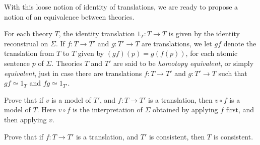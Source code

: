 With this loose notion of identity of translations, we are ready to
propose a notion of an equivalence between theories.

\begin{defn} For each theory $T$, the identity translation
  $1_T:T\to T$ is given by the identity reconstrual on $\Sigma$.  If
  $f:T\to T'$ and $g:T'\to T$ are translations, we let $gf$ denote the
  translation from $T$ to $T$ given by $(gf)(p)=g(f(p))$, for each
  atomic sentence $p$ of $\Sigma$.  Theories $T$ and $T'$ are said to
  be \emph{homotopy equivalent}, or simply \emph{equivalent}, just in
  case there are translations $f:T\to T'$ and $g:T'\to T$ such that
  $gf\simeq 1_T$ and $fg\simeq 1_{T'}$. \label{df:hom} \end{defn}

\begin{exercise} Prove that if $v$ is a model of $T'$, and $f:T\to T'$
  is a translation, then $v\circ f$ is a model of $T$.  Here $v\circ
  f$ is the interpretation of $\Sigma$ obtained by applying $f$ first,
  and then applying $v$.  \end{exercise}

\begin{exercise} Prove that if $f:T\to T'$ is a translation, and $T'$
  is consistent, then $T$ is consistent. \end{exercise}






